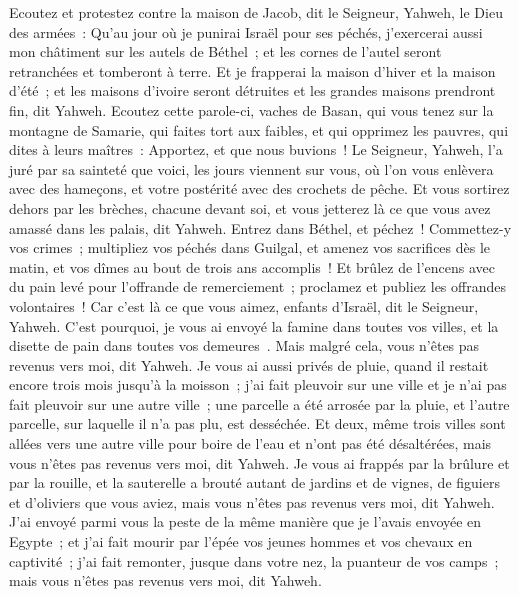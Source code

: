 \begin{multicols}{2}
Ecoutez et protestez contre la maison de Jacob, dit le Seigneur, Yahweh, le Dieu des armées~:
Qu'au jour où je punirai Israël pour ses péchés, j'exercerai aussi mon châtiment sur les autels de Béthel~; et les cornes de l'autel seront retranchées et tomberont à terre.
Et je frapperai la maison d'hiver et la maison d'été~; et les maisons d'ivoire seront détruites et les grandes maisons prendront fin, dit Yahweh.
\VerseOne{}Ecoutez cette parole-ci, vaches de Basan, qui vous tenez sur la montagne de Samarie, qui faites tort aux faibles, et qui opprimez les pauvres, qui dites à leurs maîtres~: Apportez, et que nous buvions~!
Le Seigneur, Yahweh, l'a juré par sa sainteté que voici, les jours viennent sur vous, où l'on vous enlèvera avec des hameçons, et votre postérité avec des crochets de pêche.
Et vous sortirez dehors par les brèches, chacune devant soi, et vous jetterez là ce que vous avez amassé dans les palais, dit Yahweh.
Entrez dans Béthel, et péchez~! Commettez-y vos crimes~; multipliez vos péchés dans Guilgal, et amenez vos sacrifices dès le matin, et vos dîmes au bout de trois ans accomplis~!
Et brûlez de l'encens avec du pain levé pour l'offrande de remerciement~; proclamez et publiez les offrandes volontaires~! Car c'est là ce que vous aimez, enfants d'Israël, dit le Seigneur, Yahweh.
C'est pourquoi, je vous ai envoyé la famine dans toutes vos villes, et la disette de pain dans toutes vos demeures~. Mais malgré cela, vous n'êtes pas revenus vers moi, dit Yahweh.
Je vous ai aussi privés de pluie, quand il restait encore trois mois jusqu'à la moisson~; j'ai fait pleuvoir sur une ville et je n'ai pas fait pleuvoir sur une autre ville~; une parcelle a été arrosée par la pluie, et l'autre parcelle, sur laquelle il n'a pas plu, est desséchée.
Et deux, même trois villes sont allées vers une autre ville pour boire de l'eau et n'ont pas été désaltérées, mais vous n'êtes pas revenus vers moi, dit Yahweh.
Je vous ai frappés par la brûlure et par la rouille, et la sauterelle a brouté autant de jardins et de vignes, de figuiers et d'oliviers que vous aviez, mais vous n'êtes pas revenus vers moi, dit Yahweh.
J'ai envoyé parmi vous la peste de la même manière que je l'avais envoyée en Egypte~; et j'ai fait mourir par l'épée vos jeunes hommes et vos chevaux en captivité~; j'ai fait remonter, jusque dans votre nez, la puanteur de vos camps~; mais vous n'êtes pas revenus vers moi, dit Yahweh.

\end{multicols}
